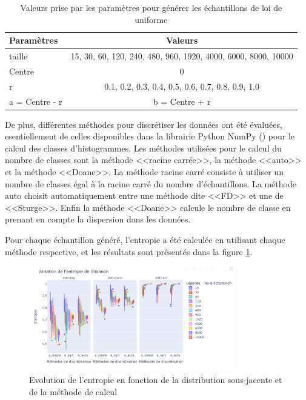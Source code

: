 \begin{table}[h]
\centering
\begin{tabular}{l c}
\toprule
Paramètres & Valeurs  \\
\midrule
taille & 15, 30, 60, 120, 240, 480, 960, 1920, 4000, 6000, 8000, 10000 \\
Centre & 0\\
r & 0.1, 0.2, 0.3, 0.4, 0.5, 0.6, 0.7, 0.8, 0.9, 1.0 \\
a = Centre - r & b = Centre + r \\
\bottomrule
\end{tabular}
\caption{Valeurs prise par les paramètres pour générer les échantillons de loi de uniforme } \label{table:xp_uniforme}
\end{table}

De plus, différentes méthodes pour discrétiser les données ont été évaluées, esentiellement de celles disponibles dans la librairie Python NumPy (\cite{harris_array_2020}) pour le calcul des classes d'histogrammes. Les méthodes utilisées pour le calcul du nombre de classes sont la méthode <<racine carrée>>, la méthode <<auto>> et la méthode <<Doane>>. La méthode racine carré consiste à utiliser un nombre de classes égal à la racine carré du nombre d'échantillons. La méthode auto choisit automatiquement entre une méthode dite <<FD>> et une de <<Sturge>>. Enfin la méthode <<Doane>> calcule le nombre de classe en prenant en compte la dispersion dans les données.

Pour chaque échantillon généré, l'entropie a été calculée en utilisant chaque méthode respective, et les résultats sont présentés dans la figure \ref{fig:res_entropie}.

\begin{figure}[h]
    \centering
    \includegraphics[width=0.8\textwidth]{ILLUSTRATIONS/entropie_size_box_distxp.png}
    \caption{Evolution de l'entropie en fonction de la distribution sous-jacente et de la méthode de calcul}
    \label{fig:res_entropie}
\end{figure}


